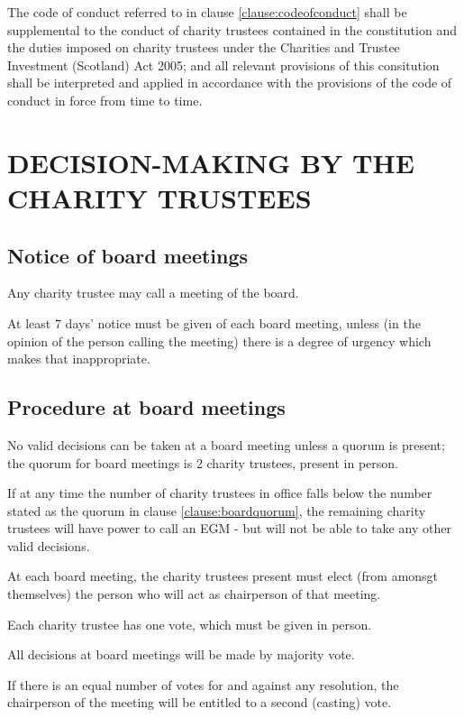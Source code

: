 \documentclass{article}
\newcommand{\charityact}{Charities and Trustee Investment (Scotland) Act 2005}
\begin{document}
\clause The code of conduct referred to in clause
\ref{clause:codeofconduct} shall be supplemental to the conduct of
charity trustees contained in the constitution and the duties imposed
on charity trustees under the \charityact; and all relevant provisions
of this consitution shall be interpreted and applied in accordance
with the provisions of the code of conduct in force from time to time.

\section{DECISION-MAKING BY THE CHARITY TRUSTEES}

\subsection{Notice of board meetings}

\clause Any charity trustee may call a meeting of the board.

\clause At least 7 days' notice must be given of each board meeting,
unless (in the opinion of the person calling the meeting) there is a
degree of urgency which makes that inappropriate.

\subsection{Procedure at board meetings}

\clause\label{clause:boardquorum}No valid decisions can be taken at a
board meeting unless a quorum is present; the quorum for board
meetings is 2 charity trustees, present in person.

\clause If at any time the number of charity trustees in office falls
below the number stated as the quorum in clause
\ref{clause:boardquorum}, the remaining charity trustees will have
power to call an EGM - but will not be able to take any other valid
decisions.

\clause At each board meeting, the charity trustees present must elect
(from amonsgt themselves) the person who will act as chairperson of
that meeting.

\clause Each charity trustee has one vote, which must be given in
person.

\clause All decisions at board meetings will be made by majority vote.

\clause If there is an equal number of votes for and against any
resolution, the chairperson of the meeting will be entitled to a
second (casting) vote.
\end{document}
